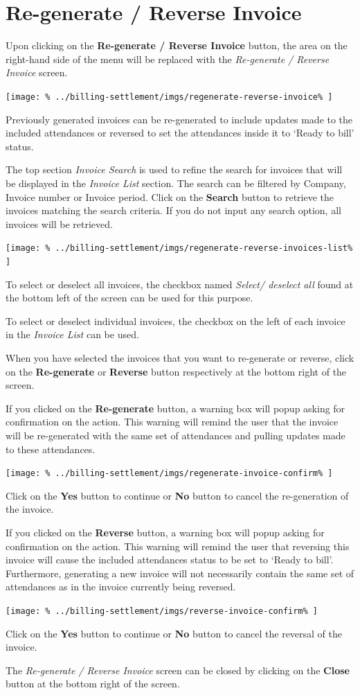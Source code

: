 \documentclass[../main/main]{subfiles}
\begin{document}
\newpage
\section{Re-generate / Reverse Invoice}
\label{sec:re-generate-reverse-invoice}

Upon clicking on the \textbf{Re-generate / Reverse Invoice} button,
the area on the right-hand side of the menu will be replaced with the
\emph{Re-generate / Reverse Invoice} screen.

\texttt{[image: \%
  ../billing-settlement/imgs/regenerate-reverse-invoice\%
]}

Previously generated invoices can be re-generated to include updates made to the
included attendances or reversed to set the attendances inside it to `Ready to
bill' status.

The top section \emph{Invoice Search} is used to refine the search for invoices
that will be displayed in the \emph{Invoice List} section.
The search can be filtered by Company, Invoice number or Invoice period.
Click on the \textbf{Search} button to retrieve the invoices matching the search
criteria. If you do not input any search option, all invoices will be retrieved.

\texttt{[image: \%
  ../billing-settlement/imgs/regenerate-reverse-invoices-list\%
]}

To select or deselect all invoices, the checkbox named
\emph{Select/ deselect all} found at the bottom left of the screen can be used
for this purpose.

To select or deselect individual invoices, the checkbox on the left of each
invoice in the \emph{Invoice List} can be used.

When you have selected the invoices that you want to re-generate or reverse,
click on the \textbf{Re-generate} or \textbf{Reverse} button respectively at the
bottom right of the screen.

If you clicked on the \textbf{Re-generate} button, a warning box will popup
asking for confirmation on the action. This warning will remind the user that
the invoice will be re-generated with the same set of attendances and pulling
updates made to these attendances.

\texttt{[image: \%
  ../billing-settlement/imgs/regenerate-invoice-confirm\%
]}

Click on the \textbf{Yes} button to continue or \textbf{No} button to cancel
the re-generation of the invoice.

If you clicked on the \textbf{Reverse} button, a warning box will popup asking
for confirmation on the action. This warning will remind the user that reversing
this invoice will cause the included attendances status to be set to `Ready to
bill'. Furthermore, generating a new invoice will not necessarily contain the
same set of attendances as in the invoice currently being reversed.

\texttt{[image: \%
  ../billing-settlement/imgs/reverse-invoice-confirm\%
]}

Click on the \textbf{Yes} button to continue or \textbf{No} button to cancel
the reversal of the invoice.

The \emph{Re-generate / Reverse Invoice} screen can be closed by clicking on the
\textbf{Close} button at the bottom right of the screen.
\end{document}

